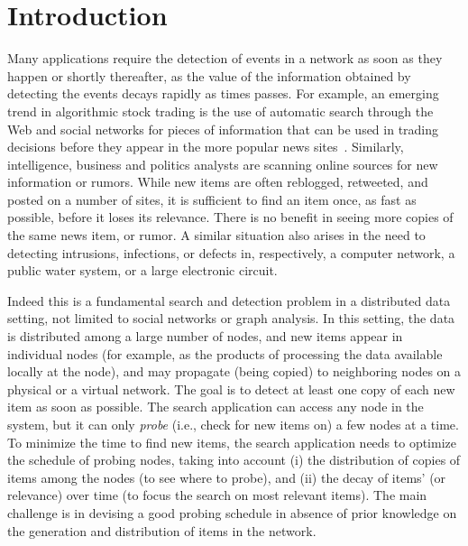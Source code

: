 \section{Introduction}\label{sec:introduction}
Many applications require the detection of events in a network as soon as they
happen or shortly thereafter, as the value of the information obtained by
detecting the events decays rapidly as times passes. For example, an emerging
trend in algorithmic stock trading is the use of automatic search through the
Web and social networks for pieces of information that can be used in trading
decisions before they appear in the more popular news
sites~\citep{Delaney2009,latar2015robot,wallstreet2015,McKinney2011}. Similarly,
intelligence, business and politics analysts are scanning online sources for new
information or rumors. While new items are often reblogged, retweeted, and
posted on a number of sites, it is sufficient to find an item once, as fast as
possible, before it loses its relevance. There is no benefit in seeing more
copies of the same news item, or rumor. A similar situation also arises in the
need to detecting intrusions, infections, or defects in, respectively, a
computer network, a public water system, or a large electronic circuit.

Indeed this is a fundamental search and detection problem in a distributed data
setting, not limited to social networks or graph analysis. In this setting, the
data is distributed among a large number of nodes, and new items appear in
individual nodes (for example, as the products of processing the data available
locally at the node), and may propagate (being copied) to neighboring nodes on a
physical or a virtual network. The goal is to detect at least one copy of each
new item as soon as possible. The search application can access any node
in the system, but it can only \emph{probe} (i.e., check for new items on) a few
nodes at a time. To minimize the time to find new items, the search application
needs to optimize the schedule of probing nodes, taking into account (i) the
distribution of copies of items among the nodes (to see where to probe), and
(ii) the decay of items' \emph{} (or relevance) over time (to
focus the search on most relevant items). The  main challenge is in devising a
good probing schedule in absence of prior knowledge on the generation and
distribution of items in the network.



